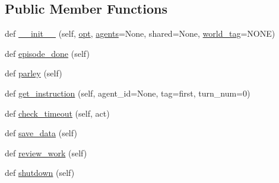 \subsection*{Public Member Functions}
\begin{DoxyCompactItemize}
\item 
def \hyperlink{classpersonality__captions_1_1worlds_1_1MTurkPersonalityCaptionsWorld_ab05199b7af0da7a70a52e5f563b7511d}{\+\_\+\+\_\+init\+\_\+\+\_\+} (self, \hyperlink{classparlai_1_1core_1_1worlds_1_1World_a3640d92718acd3e6942a28c1ab3678bd}{opt}, \hyperlink{classpersonality__captions_1_1worlds_1_1MTurkPersonalityCaptionsWorld_aab94355fe6accd2935a78f0e1836eb6c}{agents}=None, shared=None, \hyperlink{classpersonality__captions_1_1worlds_1_1MTurkPersonalityCaptionsWorld_ac344f28e6b5ef9bdf42428795054418d}{world\+\_\+tag}=\textquotesingle{}N\+O\+NE\textquotesingle{})
\item 
def \hyperlink{classpersonality__captions_1_1worlds_1_1MTurkPersonalityCaptionsWorld_a579f1033a02ede69365f79246a23d8da}{episode\+\_\+done} (self)
\item 
def \hyperlink{classpersonality__captions_1_1worlds_1_1MTurkPersonalityCaptionsWorld_ab682688b0f65bc5162cb77f3d96fafc4}{parley} (self)
\item 
def \hyperlink{classpersonality__captions_1_1worlds_1_1MTurkPersonalityCaptionsWorld_a4e9a57d65cc93af5741f56597a970618}{get\+\_\+instruction} (self, agent\+\_\+id=None, tag=\textquotesingle{}first\textquotesingle{}, turn\+\_\+num=0)
\item 
def \hyperlink{classpersonality__captions_1_1worlds_1_1MTurkPersonalityCaptionsWorld_a594560fccee92084ad833d131c77d860}{check\+\_\+timeout} (self, act)
\item 
def \hyperlink{classpersonality__captions_1_1worlds_1_1MTurkPersonalityCaptionsWorld_ae0d5bc2141cf6e64b53adf8c432bccf4}{save\+\_\+data} (self)
\item 
def \hyperlink{classpersonality__captions_1_1worlds_1_1MTurkPersonalityCaptionsWorld_a1fe4b499c8d38e26df4a7921a1672c32}{review\+\_\+work} (self)
\item 
def \hyperlink{classpersonality__captions_1_1worlds_1_1MTurkPersonalityCaptionsWorld_af1e2b434ec1e39f734379b1d35b80489}{shutdown} (self)
\end{DoxyCompactItemize}
